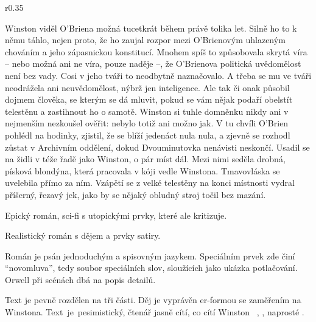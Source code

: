 \documentclass{extarticle} %
\begin{document}
\newpage


\changefontsize{7pt}


\noindent\begin{wrapfigure}{r}{0.35\textwidth}
\tiny

\setlength{\parindent}{3pt}\setlength{\parskip}{0.5em}
Winston viděl O’Briena možná tucetkrát během právě tolika let.
Silně ho to k němu táhlo, nejen proto, že ho zaujal rozpor mezi O’Brienovým uhlazeným chováním
a jeho zápasnickou konstitucí.
Mnohem spíš to způsobovala skrytá víra – nebo možná ani ne víra, pouze naděje –,
že O’Brienova politická uvědomělost není bez vady.
Cosi v jeho tváři to neodbytně naznačovalo.
A třeba se mu ve tváři neodrážela ani neuvědomělost, nýbrž jen inteligence.
Ale tak či onak působil dojmem člověka, se kterým se dá mluvit,
pokud se vám nějak podaří obelstít telestěnu a zastihnout ho o samotě.
Winston si tuhle domněnku nikdy ani v nejmenším nezkoušel ověřit: nebylo totiž ani možno jak.
V tu chvíli O’Brien pohlédl na hodinky, zjistil, že se blíží jedenáct nula nula,
a zjevně se rozhodl zůstat v Archivním oddělení, dokud Dvouminutovka nenávisti neskončí.
Usadil se na židli v téže řadě jako Winston, o pár míst dál.
Mezi nimi seděla drobná, písková blondýna, která pracovala v kóji vedle Winstona.
Tmavovláska se uvelebila přímo za ním.
Vzápětí se z velké telestěny na konci místnosti vydral příšerný, řezavý jek,
jako by se nějaký obludný stroj točil bez mazání.
\end{wrapfigure}


\noindent Epický román, sci-fi s utopickými prvky, které ale kritizuje.

\noindent Realistický román s  dějem a prvky satiry.

\noindent Román je psán jednoduchým a spisovným jazykem.
Speciálním prvek zde činí \enquote{novomluva},
tedy soubor speciálních slov, sloužících jako ukázka potlačování.
Orwell při scénách dbá na popis detailů.



\noindent Text je pevně rozdělen na tři části.
Děj je vyprávěn er-formou se zaměřením na Winstona.
Text~je~pesimistický, čtenář jasně cítí, co cítí Winston
\textbfhl{$\Rightarrow$}~, , naprosté .
\end{document}
